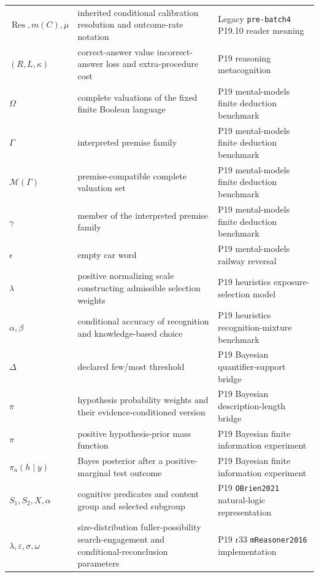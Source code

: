 \begin{longtable}{@{}p{}p{}p{}@{}}
\(\operatorname{Res},\allowbreak m(C),\allowbreak \mu\) & inherited conditional calibration resolution and outcome-rate notation & Legacy \texttt{pre-\allowbreak{}batch4} P19.\allowbreak{}10 reader meaning \\
\((R,\allowbreak L,\allowbreak \kappa)\) & correct-answer value incorrect-answer loss and extra-procedure cost & P19 reasoning metacognition \\
\(\Omega\) & complete valuations of the fixed finite Boolean language & P19 mental-\allowbreak{}models finite deduction benchmark \\
\(\Gamma\) & interpreted premise family & P19 mental-\allowbreak{}models finite deduction benchmark \\
\(\mathcal M(\Gamma)\) & premise-compatible complete valuation set & P19 mental-\allowbreak{}models finite deduction benchmark \\
\(\gamma\) & member of the interpreted premise family & P19 mental-\allowbreak{}models finite deduction benchmark \\
\(\epsilon\) & empty car word & P19 mental-\allowbreak{}models railway reversal \\
\(\lambda\) & positive normalizing scale constructing admissible selection weights & P19 heuristics exposure-\allowbreak{}selection model \\
\(\alpha,\allowbreak \beta\) & conditional accuracy of recognition and knowledge-based choice & P19 heuristics recognition-\allowbreak{}mixture benchmark \\
\(\Delta\) & declared few/most threshold & P19 Bayesian quantifier-\allowbreak{}support bridge \\
\(\pi\) & hypothesis probability weights and their evidence-conditioned version & P19 Bayesian description-\allowbreak{}length bridge \\
\(\pi\) & positive hypothesis-prior mass function & P19 Bayesian finite information experiment \\
\(\pi_a(h\mid y)\) & Bayes posterior after a positive-marginal test outcome & P19 Bayesian finite information experiment \\
\(S_1,\allowbreak S_2,\allowbreak X,\allowbreak \alpha\) & cognitive predicates and content group and selected subgroup & P19 \texttt{OBrien2021} natural-\allowbreak{}logic representation \\
\(\lambda,\allowbreak \varepsilon,\allowbreak \sigma,\allowbreak \omega\) & size-distribution fuller-possibility search-engagement and conditional-reconclusion parameters & P19 r33 \texttt{mReasoner2016} implementation \\

\end{longtable}
